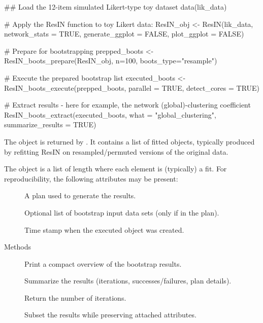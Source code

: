 \documentclass[a4paper]{book}
\begin{document}
%
\begin{Examples}
\begin{ExampleCode}
## Load the 12-item simulated Likert-type toy dataset
data(lik_data)

# Apply the ResIN function to toy Likert data:
ResIN_obj <- ResIN(lik_data, network_stats = TRUE,
                      generate_ggplot = FALSE, plot_ggplot = FALSE)


# Prepare for bootstrapping
prepped_boots <- ResIN_boots_prepare(ResIN_obj, n=100, boots_type="resample")

# Execute the prepared bootstrap list
executed_boots <-  ResIN_boots_execute(prepped_boots, parallel = TRUE, detect_cores = TRUE)

# Extract results - here for example, the network (global)-clustering coefficient
ResIN_boots_extract(executed_boots, what = "global_clustering", summarize_results = TRUE)


\end{ExampleCode}
\end{Examples}
%
\begin{Description}
The  object is returned by
. It contains a list of fitted  objects,
typically produced by refitting ResIN on resampled/permuted versions of the original data.
\end{Description}
%
\begin{Details}
The object is a list of length  where each element is (typically) a
 fit. For reproducibility, the following attributes may be present:
\begin{description}

\item[] A  plan used to generate the results.
\item[] Optional list of bootstrap input data sets (only if  in the plan).
\item[] Time stamp when the executed object was created.

\end{description}

\end{Details}
%
\begin{Section}{Methods}

\begin{description}

\item[] Print a compact overview of the bootstrap results.
\item[] Summarize the results (iterations, successes/failures, plan details).
\item[] Return the number of iterations.
\item[] Subset the results while preserving attached attributes.

\end{description}

\end{Section}
\end{document}
